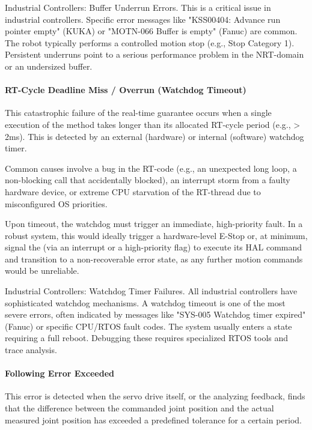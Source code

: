 \begin{principlebox}{Industrial Controllers: Buffer Underrun Errors.}
    This is a critical issue in industrial controllers. Specific error messages like "KSS00404: Advance run pointer empty" (KUKA) or "MOTN-066 Buffer is empty" (Fanuc) are common. The robot typically performs a controlled motion stop (e.g., Stop Category 1). Persistent underruns point to a serious performance problem in the NRT-domain or an undersized buffer.
\end{principlebox}

\paragraph{RT-Cycle Deadline Miss / Overrun (Watchdog Timeout)}
This catastrophic failure of the real-time guarantee occurs when a single execution of the  method takes longer than its allocated RT-cycle period (e.g., > 2ms). This is detected by an external (hardware) or internal (software) watchdog timer.

Common causes involve a bug in the RT-code (e.g., an unexpected long loop, a non-blocking call that accidentally blocked), an interrupt storm from a faulty hardware device, or extreme CPU starvation of the RT-thread due to misconfigured OS priorities.

Upon timeout, the watchdog must trigger an immediate, high-priority fault. In a robust system, this would ideally trigger a hardware-level E-Stop or, at minimum, signal the  (via an interrupt or a high-priority flag) to execute its  HAL command and transition to a non-recoverable error state, as any further motion commands would be unreliable.

\begin{principlebox}{Industrial Controllers: Watchdog Timer Failures.}
    All industrial controllers have sophisticated watchdog mechanisms. A watchdog timeout is one of the most severe errors, often indicated by messages like "SYS-005 Watchdog timer expired" (Fanuc) or specific CPU/RTOS fault codes. The system usually enters a state requiring a full reboot. Debugging these requires specialized RTOS tools and trace analysis.
\end{principlebox}

\paragraph{Following Error Exceeded}
This error is detected when the servo drive itself, or the  analyzing feedback, finds that the difference between the commanded joint position and the actual measured joint position has exceeded a predefined tolerance for a certain period.

